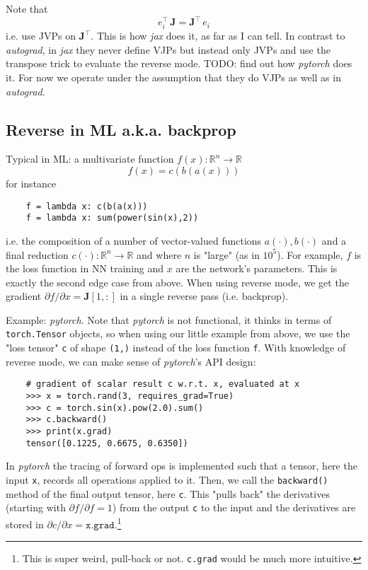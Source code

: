 \documentclass[paper=a4,11pt,headsepline]{scrartcl}
\newcommand{\ve}[1]{\ensuremath{\bm{\mathit{#1}}}}
\newcommand{\ma}[1]{\ensuremath{\bm{\mathbf{#1}}}}
\newcommand{\ra}{\ensuremath{\rightarrow}}
\newcommand{\pdi}[2]{\partial #1/\partial #2}
\newcommand{\soft}[1]{\textsl{#1}\xspace}
\newcommand{\pytorch}{\soft{pytorch}}
\newcommand{\jax}{\soft{jax}}
\newcommand{\autograd}{\soft{autograd}}
\begin{document}
Note that
\begin{equation*}
    \ve e_i^\top\,\ma J = \ma J^\top\,\ve e_i
\end{equation*}
i.e. use JVPs on $\ma J^\top$. This is how \jax does it, as far as I
can tell. In contrast to \autograd, in \jax they never define
VJPs but instead only JVPs and use the transpose trick to evaluate the reverse
mode. TODO: find out how \pytorch does it. For now we operate under the
assumption that they do VJPs as well as in \autograd.

\subsection{Reverse in ML a.k.a. backprop}

Typical in ML: a multivariate function $f(\ve x): \mathbb R^n\ra \mathbb R$
\begin{equation*}
    f(\ve x) = c(\ve b(\ve a(\ve x)))
\end{equation*}
for instance
\begin{verbatim}
    f = lambda x: c(b(a(x)))
    f = lambda x: sum(power(sin(x),2))
\end{verbatim}
i.e. the composition of a number of vector-valued functions $\ve a(\cdot), \ve
b(\cdot)$ and a final reduction $c(\cdot): \mathbb R^n\ra \mathbb R$ and where
$n$ is "large" (as in $10^5$). For example, $f$ is the loss function in NN
training and $\ve x$ are the network's parameters. This is exactly the second
edge case from above. When using reverse mode, we get the gradient $\pdi{f}{\ve
x} = \ma J[1,:]$ in a single reverse pass (i.e. backprop).

Example: \pytorch. Note that \pytorch is not functional, it thinks in terms of
\texttt{torch.Tensor} objects, so when using our little example from above, we
use the "loss tensor" \texttt{c} of shape \texttt{(1,)} instead of the loss
function \texttt{f}. With knowledge of reverse mode, we can make sense of
\pytorch's API design:
%
\begin{verbatim}
    # gradient of scalar result c w.r.t. x, evaluated at x
    >>> x = torch.rand(3, requires_grad=True)
    >>> c = torch.sin(x).pow(2.0).sum()
    >>> c.backward()
    >>> print(x.grad)
    tensor([0.1225, 0.6675, 0.6350])
\end{verbatim}
%
In \pytorch the tracing of forward ops is implemented such that a tensor, here
the input \texttt{x}, records all operations applied to it. Then, we call the
\texttt{backward()} method of the final output tensor, here \texttt{c}. This
"pulls back" the derivatives (starting with $\pdi{f}{f}=1$) from the output
\texttt{c} to the input and the derivatives are stored in $\pdi{c}{\ve x} =
\texttt{x.grad}$.\footnote{This is super weird, pull-back or not.
\texttt{c.grad} would be much more intuitive.}
\end{document}
